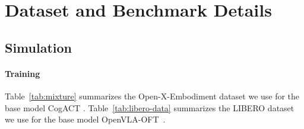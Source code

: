 \section{Dataset and Benchmark Details}
\label{app:dataset}

\subsection{Simulation}
\paragraph{Training}
Table~\ref{tab:mixture} summarizes the Open-X-Embodiment dataset we use for the base model CogACT \cite{li2024cogact}. Table~\ref{tab:libero-data} summarizes the LIBERO dataset we use for the base model OpenVLA-OFT~\cite{kim2025fine}.

